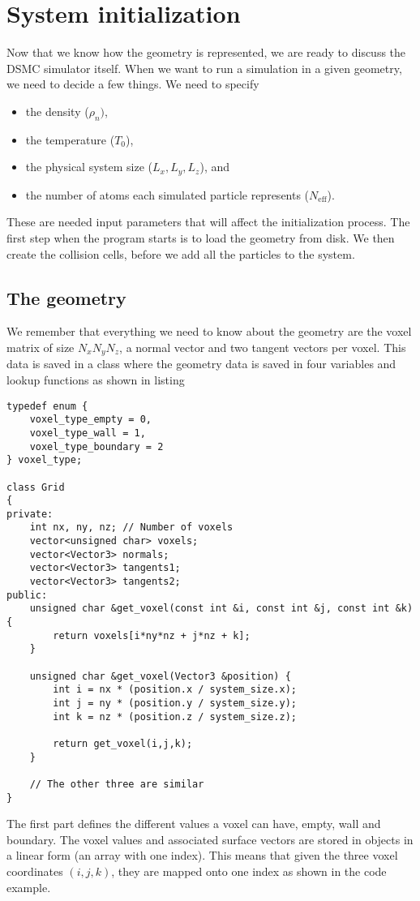 \section{System initialization}
\label{sec:dsmc_implementation_initialization}
Now that we know how the geometry is represented, we are ready to discuss the DSMC simulator itself. When we want to run a simulation in a given geometry, we need to decide a few things. We need to specify
\begin{itemize}
	\item the density ($\rho_n)$,
	\item the temperature ($T_0$),
	\item the physical system size ($L_x, L_y, L_z$), and
	\item the number of atoms each simulated particle represents ($N_\text{eff}$).
\end{itemize}
These are needed input parameters that will affect the initialization process. The first step when the program starts is to load the geometry from disk. We then create the collision cells, before we add all the particles to the system. 
\subsection{The geometry}
We remember that everything we need to know about the geometry are the voxel matrix of size $N_xN_yN_z$, a normal vector and two tangent vectors per voxel. This data is saved in a class  where the geometry data is saved in four variables and lookup functions as shown in listing
\begin{lstlisting}[caption=A Grid class example. This class contains everything we need to know about the geometry., label=lst:dsmc_class_grid]
typedef enum {
    voxel_type_empty = 0,
    voxel_type_wall = 1,
    voxel_type_boundary = 2
} voxel_type;

class Grid
{
private:
	int nx, ny, nz; // Number of voxels
	vector<unsigned char> voxels;
	vector<Vector3> normals;
	vector<Vector3> tangents1;
	vector<Vector3> tangents2;
public:
	unsigned char &get_voxel(const int &i, const int &j, const int &k) {
    	return voxels[i*ny*nz + j*nz + k];
	}

	unsigned char &get_voxel(Vector3 &position) {
		int i = nx * (position.x / system_size.x);
		int j = ny * (position.y / system_size.y);
		int k = nz * (position.z / system_size.z);

    	return get_voxel(i,j,k);
	}

	// The other three are similar
}
\end{lstlisting}
The first part defines the different values a voxel can have, empty, wall and boundary. The voxel values and associated surface vectors are stored in  objects in a linear form (an array with one index). This means that given the three voxel coordinates $(i,j,k)$, they are mapped onto one index as shown in the code example.
